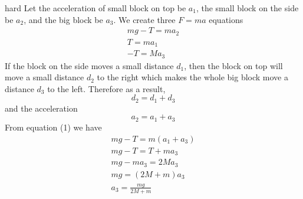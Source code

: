 \begin{solution}{hard}
Let the acceleration of small block on top be $a_1$, the small block on the side be $a_2$, and the big block be $a_3$. We create three $F=ma$ equations
\begin{align}
mg-T=ma_2\\
T=ma_1\\
-T=Ma_3
\end{align}If the block on the side moves a small distance $d_1$, then the block on top will move a small distance $d_2$ to the right which makes the whole big block move a distance $d_3$ to the left. Therefore as a result,
\[
d_2=d_1+d_3
\]and the acceleration
\[
a_2=a_1+a_3
\]From equation (1) we have
\begin{align*}
mg-T=m(a_1+a_3)\\
mg-T=T+ma_3\\
mg-ma_3=2Ma_3\\
mg=(2M+m)a_3\\
\boxed{a_3=\frac{mg}{2M+m}}
\end{align*}
\end{solution}
